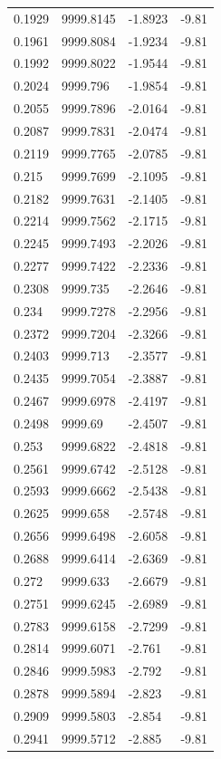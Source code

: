 \begin{table}[H]
\begin{tabular}{llll}
0.1929 & 9999.8145 & -1.8923 & -9.81 \\
0.1961 & 9999.8084 & -1.9234 & -9.81 \\
0.1992 & 9999.8022 & -1.9544 & -9.81 \\
0.2024 & 9999.796 & -1.9854 & -9.81 \\
0.2055 & 9999.7896 & -2.0164 & -9.81 \\
0.2087 & 9999.7831 & -2.0474 & -9.81 \\
0.2119 & 9999.7765 & -2.0785 & -9.81 \\
0.215 & 9999.7699 & -2.1095 & -9.81 \\
0.2182 & 9999.7631 & -2.1405 & -9.81 \\
0.2214 & 9999.7562 & -2.1715 & -9.81 \\
0.2245 & 9999.7493 & -2.2026 & -9.81 \\
0.2277 & 9999.7422 & -2.2336 & -9.81 \\
0.2308 & 9999.735 & -2.2646 & -9.81 \\
0.234 & 9999.7278 & -2.2956 & -9.81 \\
0.2372 & 9999.7204 & -2.3266 & -9.81 \\
0.2403 & 9999.713 & -2.3577 & -9.81 \\
0.2435 & 9999.7054 & -2.3887 & -9.81 \\
0.2467 & 9999.6978 & -2.4197 & -9.81 \\
0.2498 & 9999.69 & -2.4507 & -9.81 \\
0.253 & 9999.6822 & -2.4818 & -9.81 \\
0.2561 & 9999.6742 & -2.5128 & -9.81 \\
0.2593 & 9999.6662 & -2.5438 & -9.81 \\
0.2625 & 9999.658 & -2.5748 & -9.81 \\
0.2656 & 9999.6498 & -2.6058 & -9.81 \\
0.2688 & 9999.6414 & -2.6369 & -9.81 \\
0.272 & 9999.633 & -2.6679 & -9.81 \\
0.2751 & 9999.6245 & -2.6989 & -9.81 \\
0.2783 & 9999.6158 & -2.7299 & -9.81 \\
0.2814 & 9999.6071 & -2.761 & -9.81 \\
0.2846 & 9999.5983 & -2.792 & -9.81 \\
0.2878 & 9999.5894 & -2.823 & -9.81 \\
0.2909 & 9999.5803 & -2.854 & -9.81 \\
0.2941 & 9999.5712 & -2.885 & -9.81 \\

\end{tabular}
\end{table}
